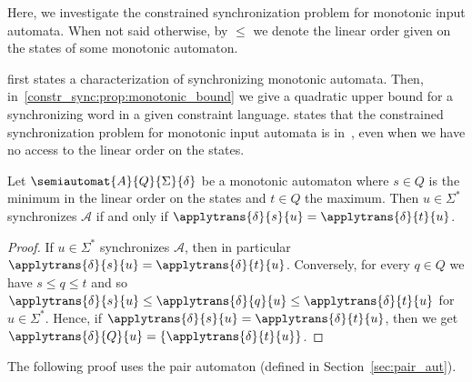 
Here, we investigate the constrained synchronization problem for monotonic input automata.
When not said otherwise, by $\le$ we denote the linear order given on the states
of some monotonic automaton.

 first states 
a characterization of synchronizing monotonic automata.
Then, in~\cref{constr_sync:prop:monotonic_bound} 
we give a quadratic upper bound for a synchronizing word in a given constraint language.
states that the constrained synchronization problem
for monotonic input automata is in~\NL, 
even when we have no access to the linear order on the states.

\begin{lemma}
	\label{constr_sync:lem:monotonic_min_max_sync}
	Let $\semiautomat{A}{Q}{\Sigma}{\delta}$ be a monotonic automaton
	where $s \in Q$ is the minimum in the linear order on the states
	and $t \in Q$ the maximum.
	Then $u \in \Sigma^*$ synchronizes $\mathcal A$
	if and only if $\applytrans{\delta}{s}{u} = \applytrans{\delta}{t}{u}$.
\end{lemma}
\begin{proof}
	If $u \in \Sigma^*$ synchronizes $\mathcal A$,
	then in particular  $\applytrans{\delta}{s}{u} = \applytrans{\delta}{t}{u}$.
	Conversely, for every $q \in Q$ we have $s \le q \le t$
	and so $\applytrans{\delta}{s}{u} \le \applytrans{\delta}{q}{u} \le \applytrans{\delta}{t}{u}$
	for $u \in \Sigma^*$.
	Hence, if $\applytrans{\delta}{s}{u} = \applytrans{\delta}{t}{u}$,
	then we get $\applytrans{\delta}{Q}{u} = \{ \applytrans{\delta}{t}{u} \}$. 
\end{proof}

The following proof uses the pair automaton (defined in Section~\ref{sec:pair_aut}).

